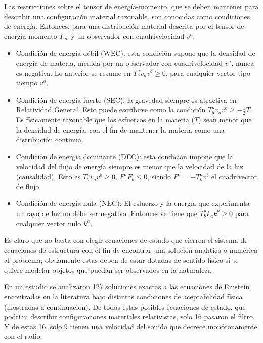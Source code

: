 \documentclass[letterpaper,11pt]{article}
\begin{document}
Las restricciones sobre el tensor de energía-momento, que se deben mantener para describir una configuración material razonable, son conocidas como condiciones de energía. Entonces, para una distribución material descrita por el tensor de energía-momento $T_{ab}$ y un observador con cuadrivelocidad $v^{a}$:

\begin{itemize}
    \item Condición de energía débil (WEC): esta condición supone que la densidad de energía de materia, medida por un observador con cuadrivelocidad $v^{a}$, nunca es negativa. Lo anterior se resume en  $T^{a}_{b} v_{a} v^{b} \geq 0$, para cualquier vector tipo tiempo $v^{a}$.
    
    \item Condición de energía fuerte (SEC): la gravedad siempre es atractiva en Relatividad General. Esto puede escribirse como la condición $T^{a}_{b} v_{a} v^{b} \geq - \frac{1}{2} T$. Es físicamente razonable que los esfuerzos en la materia ($T$) sean menor que la densidad de energía, con el fin de mantener la materia como una distribución continua.
    
    \item Condición de energía dominante (DEC): esta condición impone que la velocidad del flujo de energía siempre es menor que la velocidad de la luz (causalidad). Esto es $T^{a}_{b} v_{a} v^{b} \geq 0$, $F^{a} F_{b} \leq 0 $, siendo $F^{a} = - T^{a}_{b} v^{b}$ el cuadrivector de flujo.
    \item Condición de energía nula (NEC): El esfuerzo y la energía que experimenta un rayo de luz no debe ser negativo. Entonces se tiene que $T^{a}_{b} k_{a} k^{b} \geq 0$ para cualquier vector nulo $k^{a}$.
\end{itemize}


Es claro que no basta con elegir ecuaciones de estado que cierren el sistema de ecuaciones de estructura con el fin de encontrar una solución analítica o numérica al problema; obviamente estas deben de estar dotadas de sentido físico si se quiere modelar objetos que puedan ser observados en la naturaleza.

En un estudio \cite{delgaty1998physical} se analizaron 127 soluciones exactas a las ecuaciones de Einstein encontradas en la literatura bajo distintas condiciones de aceptabilidad física (mostradas a continuación). De todas estas posibles ecuaciones de estado, que podrían describir configuraciones materiales relativistas, solo 16 pasaron el filtro. Y de estas 16, solo 9 tienen una velocidad del sonido que decrece monótonamente con el radio. 
\end{document}
